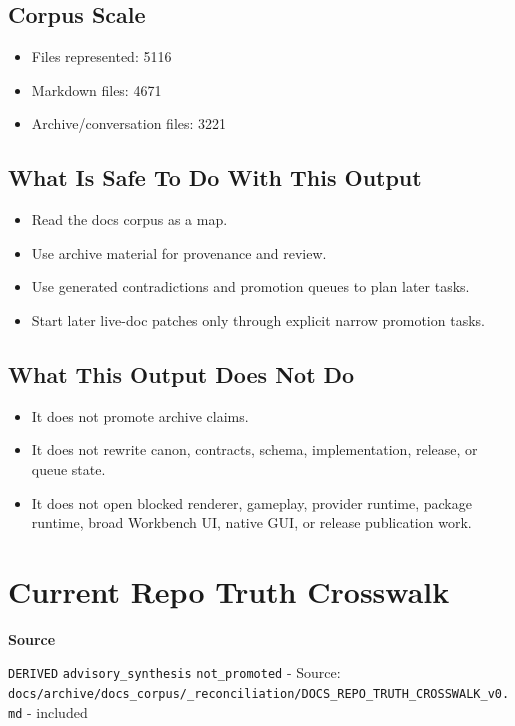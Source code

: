 \documentclass[10.5pt,a4paper,openany]{book}
\newcommand{\vonecallout}[3]{\par\medskip\noindent\begingroup\setlength{\fboxsep}{7pt}\colorbox{DomCalloutBg}{\parbox{0.94\linewidth}{\textbf{\textcolor{#1}{#2}}\par #3}}\endgroup\par\medskip}
\begin{document}
\subsection{Corpus Scale}

\begin{itemize}
\item Files represented: 5116
\item Markdown files: 4671
\item Archive/\allowbreak{}conversation files: 3221
\end{itemize}

\subsection{What Is Safe To Do With This Output}

\begin{itemize}
\item Read the docs corpus as a map.\allowbreak{}
\item Use archive material for provenance and review.\allowbreak{}
\item Use generated contradictions and promotion queues to plan later tasks.\allowbreak{}
\item Start later live-\allowbreak{}doc patches only through explicit narrow promotion tasks.\allowbreak{}
\end{itemize}

\subsection{What This Output Does Not Do}

\begin{itemize}
\item It does not promote archive claims.\allowbreak{}
\item It does not rewrite canon, contracts, schema, implementation, release, or queue state.\allowbreak{}
\item It does not open blocked renderer, gameplay, provider runtime, package runtime, broad Workbench UI, native GUI, or release publication work.\allowbreak{}
\end{itemize}



\section{Current Repo Truth Crosswalk}

\vonecallout{DomSlate}{Source}{\texttt{DERIVED} \texttt{advisory\_\allowbreak{}synthesis} \texttt{not\_\allowbreak{}promoted} -\allowbreak{} Source: \texttt{docs/\allowbreak{}archive/\allowbreak{}docs\_\allowbreak{}corpus/\allowbreak{}\_\allowbreak{}reconciliation/\allowbreak{}DOCS\_\allowbreak{}REPO\_\allowbreak{}TRUTH\_\allowbreak{}CROSSWALK\_\allowbreak{}v0.\allowbreak{}md} -\allowbreak{} included}
\end{document}
